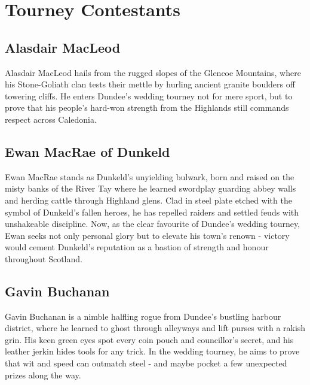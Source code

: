 \section*{Tourney Contestants}%
\subsection*{Alasdair MacLeod}\label{char:AlasdairMacLeod}
{\entryfont Alasdair MacLeod hails from the rugged slopes of the Glencoe Mountains, where his Stone-Goliath clan tests their mettle by hurling ancient granite boulders off towering cliffs. He enters Dundee's wedding tourney not for mere sport, but to prove that his people's hard-won strength from the Highlands still commands respect across Caledonia.}

\vfill\eject
\subsection*{Ewan MacRae of Dunkeld}\label{char:EwanMacRae}
{\entryfont Ewan MacRae stands as Dunkeld's unyielding bulwark, born and raised on the misty banks of the River Tay where he learned swordplay guarding abbey walls and herding cattle through Highland glens. Clad in steel plate etched with the symbol of Dunkeld's fallen heroes, he has repelled raiders and settled feuds with unshakeable discipline. Now, as the clear favourite of Dundee's wedding tourney, Ewan seeks not only personal glory but to elevate his town's renown - victory would cement Dunkeld's reputation as a bastion of strength and honour throughout Scotland.}

\vfill\eject
\subsection*{Gavin Buchanan}\label{char:GavinBuchanan}
{\entryfont Gavin Buchanan is a nimble halfling rogue from Dundee's bustling harbour district, where he learned to ghost through alleyways and lift purses with a rakish grin. His keen green eyes spot every coin pouch and councillor's secret, and his leather jerkin hides tools for any trick. In the wedding tourney, he aims to prove that wit and speed can outmatch steel - and maybe pocket a few unexpected prizes along the way.}

\vfill\eject
